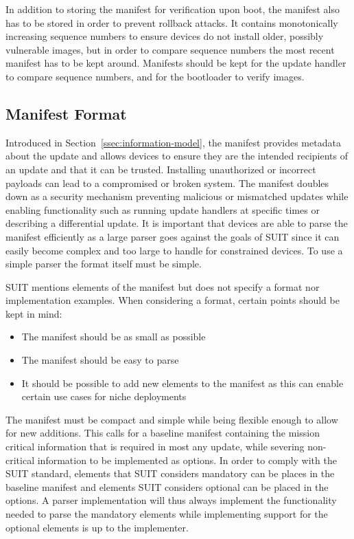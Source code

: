 \documentclass[0-thesis.tex]{subfiles}
\begin{document}
In addition to storing the manifest for verification upon boot, the manifest also has to
be stored in order to prevent rollback attacks. It contains monotonically increasing
sequence numbers to ensure devices do not install older, possibly vulnerable images, but
in order to compare sequence numbers the most recent manifest has to be kept around.
Manifests should be kept for the update handler to compare sequence numbers, and for the
bootloader to verify images.

\subsection{Manifest Format}
\label{ssec:manifest-format}
Introduced in Section~\ref{ssec:information-model}, the manifest provides metadata about
the update and allows devices to ensure they are the intended recipients of an update and
that it can be trusted. Installing unauthorized or incorrect payloads can lead to a
compromised or broken system. The manifest doubles down as a security mechanism preventing
malicious or mismatched updates while enabling functionality such as running update
handlers at specific times or describing a differential update. It is important that
devices are able to parse the manifest efficiently as a large parser goes against the
goals of SUIT since it can easily become complex and too large to handle for constrained
devices. To use a simple parser the format itself must be simple.

SUIT mentions elements of the manifest but does not specify a format nor implementation
examples. When considering a format, certain points should be kept in mind:

\begin{itemize}
        \item The manifest should be as small as possible
        \item The manifest should be easy to parse
        \item It should be possible to add new elements to the manifest as this can enable
                certain use cases for niche deployments
\end{itemize}

The manifest must be compact and simple while being flexible enough to allow for new
additions. This calls for a baseline manifest containing the mission critical information
that is required in most any update, while severing non-critical information to be
implemented as options. In order to comply with the SUIT standard, elements that SUIT
considers mandatory can be places in the baseline manifest and elements SUIT considers
optional can be placed in the options. A parser implementation will thus always implement
the functionality needed to parse the mandatory elements while implementing support for
the optional elements is up to the implementer. %
\end{document}
